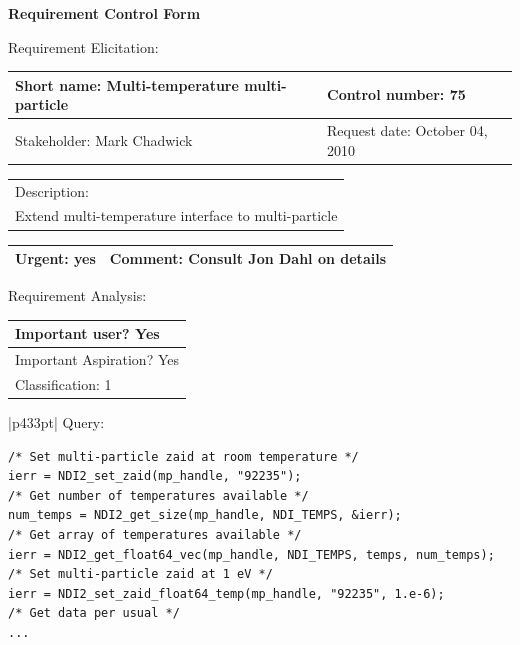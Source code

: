 \begin{center}\Large\bf
Requirement Control Form
\end{center}
\vspace{24pt}

Requirement Elicitation:

\begin{tabular}{|p{211pt}|p{211pt}|} \hline
Short name: Multi-temperature multi-particle & Control number: 75\\ \hline
Stakeholder: Mark Chadwick & Request date: October 04, 2010\\
\end{tabular}
\begin{tabular}{|p{433pt}|} \hline
Description: \\ 
Extend multi-temperature interface to multi-particle
\\ \hline
\end{tabular} 
\begin{tabular}{|p{211pt}|p{211pt}|} \hline
Urgent: yes & Comment: Consult Jon Dahl on details
\\ \hline
\end{tabular}

\vspace{24pt}

Requirement Analysis:

\begin{tabular}{|p{433pt}|} \hline
Important user? Yes \\ \hline
Important Aspiration? Yes \\ \hline
Classification: 1 \\ \hline
\end{tabular}

\vspace{12pt}

\begin{tabular}{|p{433pt}|} \hline
Query:
\begin{verbatim}
/* Set multi-particle zaid at room temperature */
ierr = NDI2_set_zaid(mp_handle, "92235");
/* Get number of temperatures available */
num_temps = NDI2_get_size(mp_handle, NDI_TEMPS, &ierr);
/* Get array of temperatures available */
ierr = NDI2_get_float64_vec(mp_handle, NDI_TEMPS, temps, num_temps);
/* Set multi-particle zaid at 1 eV */
ierr = NDI2_set_zaid_float64_temp(mp_handle, "92235", 1.e-6);
/* Get data per usual */
...

\end{verbatim}
\\ \hline

\end{tabular}
\vspace{24pt}

